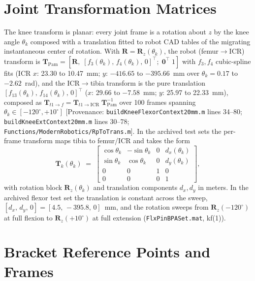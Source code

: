 \section{Joint Transformation Matrices}

The knee transform is planar: every joint frame is a rotation about $z$ by the knee angle $\theta_{k}$ composed with a translation fitted to robot CAD tables of the migrating instantaneous center of rotation. With $\mathbf{R} = \mathbf{R}_{z}(\theta_{k})$, the robot (femur$\to$ICR) transform is $\mathbf{T}_{\text{Pam}} = [\mathbf{R},\; [f_{3}(\theta_{k}),\,f_{4}(\theta_{k}),\,0]^{\top};\; \mathbf{0}^{\top}\;1]$ with $f_{3}, f_{4}$ cubic-spline fits (ICR $x$: 23.30 to 10.47~mm; $y$: $-416.65$ to $-395.66$~mm over $\theta_{k} = 0.17$ to $-2.62$~rad), and the ICR$\to$tibia transform is the pure translation $[f_{13}(\theta_{k}),\,f_{14}(\theta_{k}),\,0]^{\top}$ ($x$: 29.66 to $-7.58$~mm; $y$: 25.97 to 22.33~mm), composed as $\mathbf{T}_{t1\to f} = \mathbf{T}_{t1\to\text{ICR}}\;\mathbf{T}_{\text{Pam}}^{-1}$ over 100 frames spanning $\theta_{k} \in [-120^{\circ}, +10^{\circ}]$ [Provenance: \texttt{buildKneeFlexorContext20mm.m} lines 34--80; \texttt{buildKneeExtContext20mm.m} lines 30--78; \texttt{Functions/ModernRobotics/RpToTrans.m}]. In the archived test sets the per-frame transform maps tibia to femur/ICR and takes the form
\begin{equation}
    \mathbf{T}_{k}(\theta_{k}) \;=\;
    \begin{bmatrix}
    \cos\theta_{k} & -\sin\theta_{k} & 0 & d_{x}(\theta_{k})\\
    \sin\theta_{k} & \cos\theta_{k} & 0 & d_{y}(\theta_{k})\\
    0 & 0 & 1 & 0\\
    0 & 0 & 0 & 1
    \end{bmatrix},
    \label{eq:app_Tk}
\end{equation}
with rotation block $\mathbf{R}_{z}(\theta_{k})$ and translation components $d_{x}, d_{y}$ in meters. In the archived flexor test set the translation is constant across the sweep, $[d_{x},\,d_{y},\,0] = [4.5,\,-395.8,\,0]$~mm, and the rotation sweeps from $\mathbf{R}_{z}(-120^{\circ})$ at full flexion to $\mathbf{R}_{z}(+10^{\circ})$ at full extension (\texttt{FlxPinBPASet.mat}, kf(1)).

\section{Bracket Reference Points and Frames}

